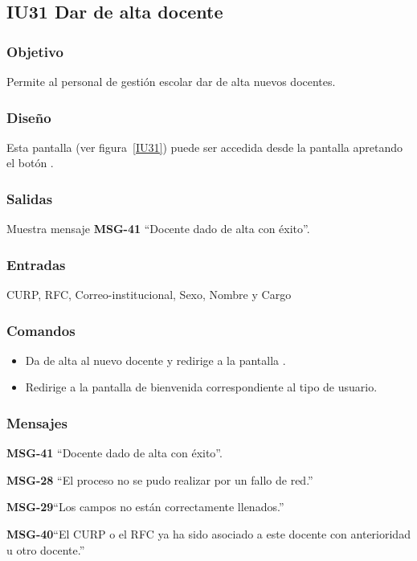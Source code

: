 
\subsection{IU31 Dar de alta docente}
\subsubsection{Objetivo}
    Permite al personal de gestión escolar dar de alta nuevos docentes.
\subsubsection{Diseño}
    Esta pantalla  (ver figura~\ref{IU31}) puede ser accedida desde la pantalla  apretando el botón .

\subsubsection{Salidas}
Muestra mensaje {\bf MSG-41} ``Docente dado de alta con éxito''.
\subsubsection{Entradas}
CURP, RFC, Correo-institucional, Sexo, Nombre y Cargo
\subsubsection{Comandos}
\begin{itemize}
    \item {} Da de alta al nuevo docente y redirige a la pantalla .
    \item {} Redirige a la pantalla de bienvenida correspondiente al tipo de usuario.
    
\end{itemize}

\subsubsection{Mensajes}

\begin{Citemize}
    \item {\bf MSG-41} ``Docente dado de alta con éxito''.
    \item {\bf MSG-28}  ``El proceso no se pudo realizar por un fallo de red.''
    \item {\bf MSG-29}{``Los campos no están correctamente llenados.''}
    \item {\bf MSG-40}{``El CURP o el RFC ya ha sido asociado a este docente con anterioridad u otro docente.''}
\end{Citemize}

